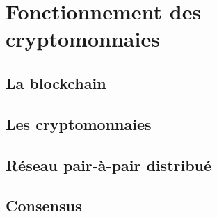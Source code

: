 \documentclass[../tb_report.tex]{subfiles}
\begin{document}
  
\chapter{Fonctionnement des cryptomonnaies}
\label{ch:presentation}

\section{La blockchain}

\section{Les cryptomonnaies}

\section{Réseau pair-à-pair distribué}

\section{Consensus}
\end{document}
